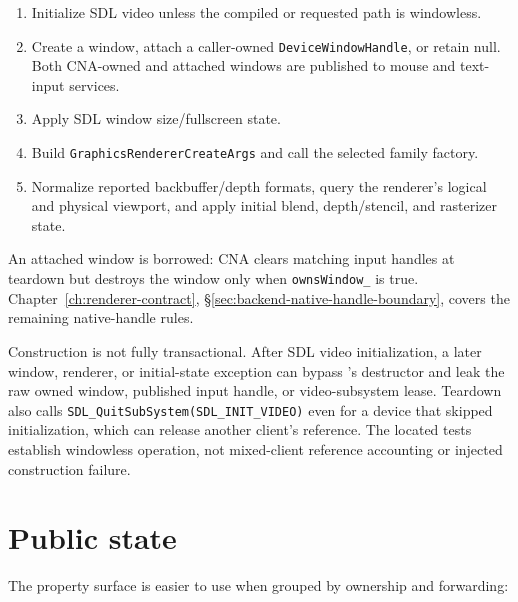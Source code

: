 \begin{enumerate}
  \item Initialize SDL video unless the compiled or requested path is windowless.
  \item Create a window, attach a caller-owned \texttt{DeviceWindowHandle}, or retain null.
        Both CNA-owned and attached windows are published to mouse and text-input services.
  \item Apply SDL window size/fullscreen state.
  \item Build \texttt{GraphicsRendererCreateArgs} and call the selected family factory.
  \item Normalize reported backbuffer/depth formats, query the renderer's logical and physical
        viewport, and apply initial blend, depth/stencil, and rasterizer state.
\end{enumerate}

An attached window is borrowed: CNA clears matching input handles at teardown but destroys the
window only when \texttt{ownsWindow\_} is true. Chapter~\ref{ch:renderer-contract},
\S\ref{sec:backend-native-handle-boundary}, covers the remaining native-handle rules.

\begin{limitationnote}
Construction is not fully transactional. After SDL video initialization, a later window,
renderer, or initial-state exception can bypass 's destructor and leak
the raw owned window, published input handle, or video-subsystem lease. Teardown also calls
\texttt{SDL\_QuitSubSystem(SDL\_INIT\_VIDEO)} even for a device that skipped initialization,
which can release another client's reference. The located tests establish windowless operation,
not mixed-client reference accounting or injected construction failure.
\end{limitationnote}

\section{Public state}
\label{sec:property-surface}

The property surface is easier to use when grouped by ownership and forwarding:

